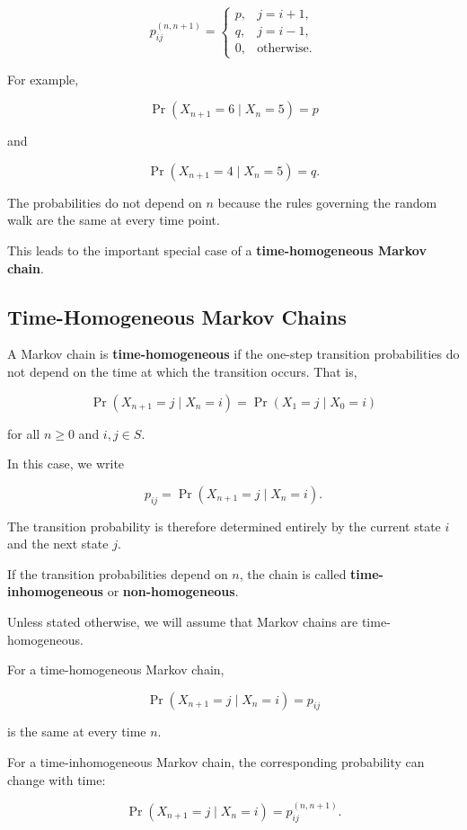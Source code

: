 \documentclass[
  letterpaper,
  DIV=11,
  numbers=noendperiod]{scrartcl}
\theoremstyle{definition}
\theoremstyle{remark}
\begin{document}
\[
p_{ij}^{(n,n+1)}
=\begin{cases}
p, & j=i+1,\\
q, & j=i-1,\\
0, & \text{otherwise}.
\end{cases}
\]

For example,

\[
\Pr(X_{n+1}=6\mid X_n=5)=p
\]

and

\[
\Pr(X_{n+1}=4\mid X_n=5)=q.
\]

The probabilities do not depend on \(n\) because the rules governing the
random walk are the same at every time point.

This leads to the important special case of a \textbf{time-homogeneous
Markov chain}.

\subsection{Time-Homogeneous Markov
Chains}\label{time-homogeneous-markov-chains}

A Markov chain is \textbf{time-homogeneous} if the one-step transition
probabilities do not depend on the time at which the transition occurs.
That is,

\[
\Pr(X_{n+1}=j\mid X_n=i)
=\Pr(X_1=j\mid X_0=i)
\]

for all \(n\geq 0\) and \(i,j\in S\).

In this case, we write

\[
p_{ij}
=\Pr(X_{n+1}=j\mid X_n=i).
\]

The transition probability is therefore determined entirely by the
current state \(i\) and the next state \(j\).

If the transition probabilities depend on \(n\), the chain is called
\textbf{time-inhomogeneous} or \textbf{non-homogeneous}.

Unless stated otherwise, we will assume that Markov chains are
time-homogeneous.

\begin{tcolorbox}[enhanced jigsaw, arc=.35mm, bottomrule=.15mm, bottomtitle=1mm, breakable, colback=white, colbacktitle=quarto-callout-note-color!10!white, colframe=quarto-callout-note-color-frame, coltitle=black, left=2mm, leftrule=.75mm, opacityback=0, opacitybacktitle=0.6, rightrule=.15mm, title=\textcolor{quarto-callout-note-color}{\faInfo}\hspace{0.5em}{Homogeneous versus non-homogeneous}, titlerule=0mm, toprule=.15mm, toptitle=1mm]

For a time-homogeneous Markov chain,

\[
\Pr(X_{n+1}=j\mid X_n=i)=p_{ij}
\]

is the same at every time \(n\).

For a time-inhomogeneous Markov chain, the corresponding probability can
change with time:

\[
\Pr(X_{n+1}=j\mid X_n=i)=p_{ij}^{(n,n+1)}.
\]

\end{tcolorbox}
\end{document}
